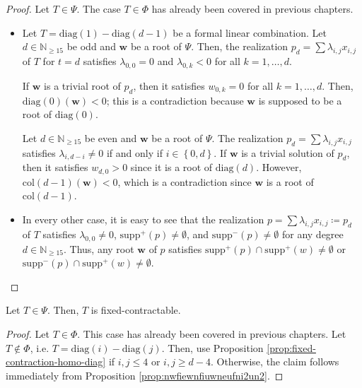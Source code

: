 \begin{proof}
    Let \( T \in \Psi \). The case \( T \in \Phi \) has already been covered in previous chapters.

    \begin{itemize}
        \item Let \( T = \mathrm{diag}(1) - \mathrm{diag}(d-1) \) be a formal linear combination. Let \( d \in \mathbb{N}_{\geq 15} \) be odd and \( \mathbf{w} \) be a root of \( \Psi \). Then, the realization \( p_d = \sum \lambda_{i,j}x_{i,j}\) of \( T \) for \( t = d \) satisfies \( \lambda_{0,0} = 0 \) and \( \lambda_{0,k} < {0} \) for all \( k = 1, \dots, d \).
    
        If \( \mathbf{w} \) is a trivial root of \( p_d \), then it satisfies \( w_{0,k} = 0 \) for all \( k = 1, \dots, d \). Then, \( \mathrm{diag}(0)(\mathbf{w}) < 0 \); this is a contradiction because \( \mathbf{w} \) is supposed to be a root of \( \mathrm{diag}(0) \).
            
            Let \( d \in \mathbb{N}_{\geq 15} \) be even and \( \mathbf{w} \) be a root of \( \Psi \). The realization \( p_d = \sum \lambda_{i,j}x_{i,j} \) satisfies \( \lambda_{i,d-i} \neq 0 \) if and only if \( i \in \left\{ 0, d \right\} \). If \( \mathbf{w} \) is a trivial solution of \( p_d \), then it satisfies \( w_{d,0} > 0 \) since it is a root of \( \mathrm{diag}(d) \). However, \( \mathrm{col}(d-1)(\mathbf{w}) < 0 \), which is a contradiction since \( \mathbf{w} \) is a root of \( \mathrm{col}(d-1) \).
        
        \item In every other case, it is easy to see that the realization \( p = \sum \lambda_{i,j} x_{i,j} \coloneqq p_d \) of \( T \) satisfies \( \lambda_{0,0} \neq 0 \), \( \mathrm{supp}^+(p) \neq \emptyset \), and \( \mathrm{supp}^-(p) \neq \emptyset \) for any degree \( d \in \mathbb{N}_{\geq 15} \). Thus, any root \( \mathbf{w} \) of \( p \) satisfies \( \mathrm{supp}^+(p) \cap \mathrm{supp}^+(w) \neq \emptyset \) or \( \mathrm{supp}^-(p) \cap \mathrm{supp}^+(w) \neq \emptyset \).
    \end{itemize}
\end{proof}

\begin{proposition}
    Let \( T \in \Psi \). Then, \( T \) is fixed-contractable.
\end{proposition}

\begin{proof}
    Let \( T \in \Phi \). This case has already been covered in previous chapters. Let \( T \notin \Phi \), i.e. \( T = \mathrm{diag}(i) - \mathrm{diag}(j) \). Then, use Proposition \ref{prop:fixed-contraction-homo-diag} if \( i,j \leq 4 \) or \( i,j \geq d-4 \). Otherwise, the claim follows immediately from Proposition \ref{prop:nwfiewnfiuwneufni2un2}.
\end{proof}


